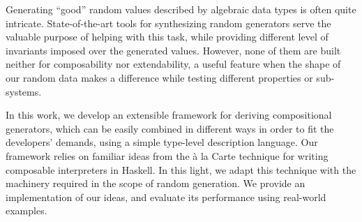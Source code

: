 Generating ``good'' random values described by algebraic data types is often
quite intricate.
%
State-of-the-art tools for synthesizing random generators serve the valuable
purpose of helping with this task, while providing different level of invariants
imposed over the generated values.
%
However, none of them are built neither for composability nor extendability, a
useful feature when the shape of our random data makes a difference while
testing different properties or sub-systems.
%


In this work, we develop an extensible framework for deriving compositional
generators, which can be easily combined in different ways in order to fit the
developers' demands, using a simple type-level description language.
%
Our framework relies on familiar ideas from the \`a la Carte technique for
writing composable interpreters in Haskell.
%
In this light, we adapt this technique with the machinery required in the scope
of random generation.
%
We provide an implementation of our ideas, and evaluate its performance using
real-world examples.
%